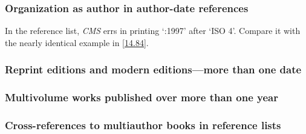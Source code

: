 \documentclass[11pt,letterpaper,oneside]{article}
\begin{document}
\subsubsection{Organization as author in author-date references}

In the reference list, \textit{CMS} errs in printing `:1997' after
`ISO 4'. Compare it with the nearly identical example in \ref{14.84}.

\begin{citeref}
\item \parencite{iso1997.ref}
\end{citeref}

\setcounter{subsubsection}{39}
\subsubsection{Reprint editions and modern editions—more than one date}

\begin{citeref}
\item \parencite{austen2003}
\item \parencite{maitland1998}
\end{citeref}

\subsubsection{Multivolume works published over more than one year}
\label{15.41}

\begin{citeref}
\item \parencite[1:133]{tillich1951}
\item \parencite[329]{hayek2011}
\end{citeref}

\subsubsection{Cross-references to multiauthor books in reference lists}

\begin{citeref}
\item \parencite{draper1987}
\item \parencite{harrington1987}
\item \parencite{zukowsky1987}
\end{citeref}
\end{document}
